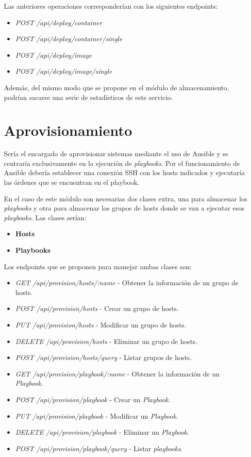 \bigskip
Las anteriores operaciones corresponderían con los siguientes endpoints:
\begin{itemize}
	\item \textit{POST /api/deploy/container}
	\item \textit{POST /api/deploy/container/single}
	\item \textit{POST /api/deploy/image}
	\item \textit{POST /api/deploy/image/single}
\end{itemize}


\bigskip
Además, del mismo modo que se propone en el módulo de almacenamiento, podrían sacarse una serie de estadísticos de este servicio.





\section{Aprovisionamiento}
Sería el encargado de aprovisionar sistemas mediante el uso de Ansible y se centraría exclusivamente en la ejecución de \textit{playbooks}. Por el funcionamiento de Ansible debería establecer una conexión SSH con los hosts indicados y ejecutaría las órdenes que se encuentran en el playbook.

\bigskip
En el caso de este módulo son necesarias dos clases extra, una para almacenar los \textit{playbooks} y otra para almacenar los grupos de hosts donde se van a ejecutar esos \textit{playbooks}. Las clases serían:
\begin{itemize}
	\item \textbf{Hosts}
	\item \textbf{Playbooks}
\end{itemize}


Los endpoints que se proponen para manejar ambas clases son:
\begin{itemize}
	\item \textit{GET /api/provision/hosts/:name} - Obtener la información de un grupo de hosts.
	\item \textit{POST /api/provision/hosts} - Crear un grupo de hosts.
	\item \textit{PUT /api/provision/hosts} - Modificar un grupo de hosts.
	\item \textit{DELETE /api/provision/hosts} - Eliminar un grupo de hosts.
	\item \textit{POST /api/provision/hosts/query} - Listar grupos de hosts.
	\item \textit{GET /api/provision/playbook/:name} - Obtener la información de un \textit{Playbook}.
	\item \textit{POST /api/provision/playbook} - Crear un \textit{Playbook}.
	\item \textit{PUT /api/provision/playbook} - Modificar un \textit{Playbook}.
	\item \textit{DELETE /api/provision/playbook} - Eliminar un \textit{Playbook}.
	\item \textit{POST /api/provision/playbook/query} - Listar \textit{playbooks}.
\end{itemize}


